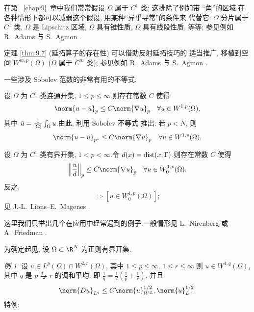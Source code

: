 在第~
\ref{chap:9}~章中我们常常假设 $\Omega$ 属于 $C^1$ 类; 这排除了例如带
``角''的区域.在各种情形下都可以减弱这个假设, 用某种``异乎寻常''的条件来
代替它: $\Omega$ 分片属于 $C^1$ 类, $\Omega$ 是 Lipschitz 区域, $\Omega$
具有锥性质, $\Omega$ 具有线段性质, 等等; 参见例如 R.~Adams 
与 S.~Agmon .

 定理  \ref{thm:9.7} (延拓算子的存在性) 可以借助反射延拓技巧的
适当推广, 移植到空间 $W^{m,p}(\Omega)$ ($\Omega$ 属于 $C^m$ 类); 参见例如
R.~Adams  与 S.~Agmon .

 一些涉及 Sobolev 范数的非常有用的不等式.


设 $\Omega$ 为 $C^1$ 类连通开集, $1\le p\le\infty$.则存在常数 $C$ 使得
\begin{equation*}
\norm{u-\bar u}_p\le C\norm{\nabla u}_p\quad\forall u\in W^{1,p}(\Omega),
\end{equation*}
其中 $\bar u=\frac1{\left|\Omega\right|}\int_\Omega u$.由此, 利用 Sobolev 不等式
推出: 若 $p<N$, 则
\begin{equation*}
\norm{u-\bar u}_{p^\star}\le C\norm{\nabla u}_p
\quad\forall u\in W^{1,p}(\Omega).
\end{equation*}


设 $\Omega$ 为 $C^1$ 类有界开集, $1<p<\infty$.令
$d(x)=\operatorname{dist}(x,\Gamma)$.则存在常数 $C$ 使得
\begin{equation*}
\left\|\frac ud\right\|_p\le C\norm{\nabla u}_p
\quad\forall u\in W_0^{1,p}(\Omega).
\end{equation*}
反之,
\begin{equation*}
[u\in W^{1,p}(\Omega)\ \text{且}\ (u/d)\in L^p(\Omega)]
\Rightarrow[u\in W_0^{1,p}(\Omega)];
\end{equation*}
见 J.-L.~Lions--E.~Magenes .


这里我们只举出几个在应用中经常遇到的例子.一般情形见
L.~Nirenberg  或 A.~Friedman .

为确定起见, 设 $\Omega\subset\R^N$ 为正则有界开集.

\noindent\emph{例 1.} 设 $u\in L^p(\Omega)\cap W^{2,r}(\Omega)$, 其中
$1\le p\le\infty$, $1\le r\le\infty$.则 $u\in W^{1,q}(\Omega)$, 其中 $q$ 是
$p$ 与 $r$ 的调和平均, 即 $\frac1q=\frac12(\frac1p+\frac1r)$, 并且
\begin{equation*}
\norm{Du}_{L^q}\le C\norm{u}_{W^{2,r}}^{1/2}\norm{u}_{L^p}^{1/2}.
\end{equation*}
特例:

